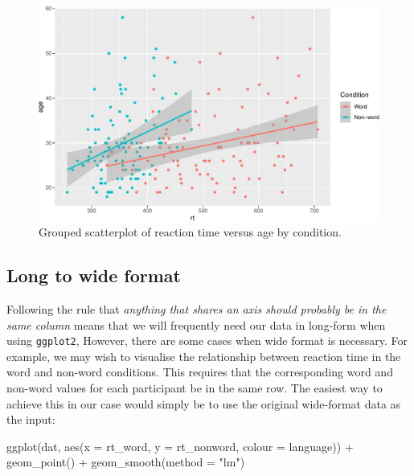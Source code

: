 \documentclass[
  english,
  doc,floatsintext]{apa6}
\newenvironment{Shaded}{\begin{snugshade}}{\end{snugshade}}
\newcommand{\AttributeTok}[1]{\textcolor[rgb]{0.77,0.63,0.00}{#1}}
\newcommand{\FunctionTok}[1]{\textcolor[rgb]{0.00,0.00,0.00}{#1}}
\newcommand{\NormalTok}[1]{#1}
\newcommand{\SpecialCharTok}[1]{\textcolor[rgb]{0.00,0.00,0.00}{#1}}
\newcommand{\StringTok}[1]{\textcolor[rgb]{0.31,0.60,0.02}{#1}}
\begin{document}
\begin{figure}

{\centering \includegraphics[width=1\linewidth]{images/scatter-grouped-1} 

}

\caption{Grouped scatterplot of reaction time versus age by condition.}\label{fig:scatter-grouped}
\end{figure}

\hypertarget{long-to-wide-format}{%
\subsection{Long to wide format}\label{long-to-wide-format}}

Following the rule that \emph{anything that shares an axis should probably be in the same column} means that we will frequently need our data in long-form when using \texttt{ggplot2}, However, there are some cases when wide format is necessary. For example, we may wish to visualise the relationship between reaction time in the word and non-word conditions. This requires that the corresponding word and non-word values for each participant be in the same row. The easiest way to achieve this in our case would simply be to use the original wide-format data as the input:

\begin{Shaded}
\begin{Highlighting}[]
\FunctionTok{ggplot}\NormalTok{(dat, }\FunctionTok{aes}\NormalTok{(}\AttributeTok{x =}\NormalTok{ rt\_word, }\AttributeTok{y =}\NormalTok{ rt\_nonword, }\AttributeTok{colour =}\NormalTok{ language)) }\SpecialCharTok{+}
  \FunctionTok{geom\_point}\NormalTok{() }\SpecialCharTok{+}
  \FunctionTok{geom\_smooth}\NormalTok{(}\AttributeTok{method =} \StringTok{"lm"}\NormalTok{)}
\end{Highlighting}
\end{Shaded}
\end{document}
